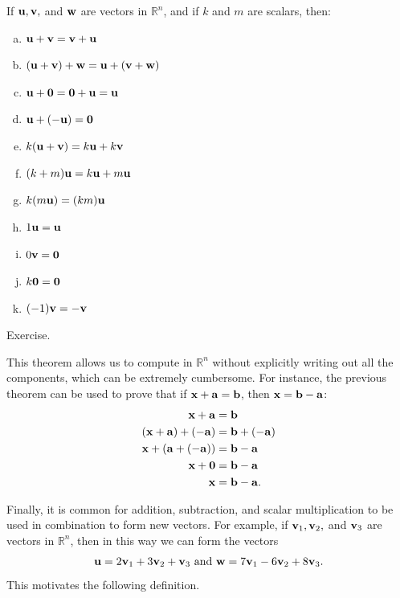 \documentclass[12pt,letterpaper,reqno]{article}
\numberwithin{equation}{section}
\begin{document}
\begin{thm}
If ${\bf u}, {\bf v},$ and ${\bf w}$ are vectors in $\mathbb{R}^n$, and if $k$ and $m$ are scalars, then:
	\begin{enumerate}[(a)]
		\item ${\bf u}+{\bf v}={\bf v}+{\bf u}$
		\item $({\bf u}+{\bf v})+{\bf w}={\bf u}+({\bf v}+{\bf w})$
		\item ${\bf u}+{\bf 0}={\bf 0}+{\bf u}={\bf u}$
		\item ${\bf u}+(-{\bf u})={\bf 0}$
		\item $k({\bf u}+{\bf v})=k{\bf u}+k{\bf v}$
		\item $(k+m){\bf u}=k{\bf u}+m{\bf u}$
		\item $k(m{\bf u})=(km){\bf u}$
		\item $1{\bf u}={\bf u}$
		\item $0{\bf v}={\bf 0}$
		\item $k{\bf 0}={\bf 0}$
		\item $(-1){\bf v}=-{\bf v}$
	\end{enumerate}
\end{thm}

\begin{pf}
Exercise.	
\end{pf}

This theorem allows us to compute in $\mathbb{R}^n$ without explicitly writing out all the components, which can be extremely cumbersome. For instance, the previous theorem can be used to prove that if ${\bf x}+{\bf a}={\bf b}$, then ${\bf x}={\bf b}-{\bf a}$:
\begin{align*}
	{\bf x}+{\bf a}&={\bf b} \\
	({\bf x}+{\bf a})+(-{\bf a})&={\bf b}+(-{\bf a}) \\
	{\bf x}+({\bf a}+(-{\bf a}))&={\bf b}-{\bf a} \\
	{\bf x}+{\bf 0}&={\bf b}-{\bf a} \\
	{\bf x}&={\bf b}-{\bf a}.
\end{align*}

Finally, it is common for addition, subtraction, and scalar multiplication to be used in combination to form new vectors. For example, if ${\bf v}_1, {\bf v}_2,$ and ${\bf v}_3$ are vectors in $\mathbb{R}^n$, then in this way we can form the vectors
\begin{align*}
	{\bf u}=2{\bf v}_1+3{\bf v}_2+{\bf v}_3 \text{ and } {\bf w}=7{\bf v}_1-6{\bf v}_2+8{\bf v}_3.
\end{align*}
This motivates the following definition.
\end{document}

